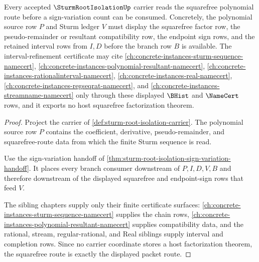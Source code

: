 \begin{theorem}
\label{thm:sturm-root-isolation-squarefree-route}
Every accepted $\SturmRootIsolationUp$ carrier reads the squarefree polynomial route before a sign-variation count can be consumed. Concretely, the polynomial source row $P$ and Sturm ledger $V$ must display the squarefree factor row, the pseudo-remainder or resultant compatibility row, the endpoint sign rows, and the retained interval rows from $I,D$ before the branch row $B$ is available. The interval-refinement certificate may cite \autoref{ch:concrete-instances-sturm-sequence-namecert}, \autoref{ch:concrete-instances-polynomial-resultant-namecert}, \autoref{ch:concrete-instances-rationalinterval-namecert}, \autoref{ch:concrete-instances-real-namecert}, \autoref{ch:concrete-instances-regseqrat-namecert}, and \autoref{ch:concrete-instances-streamname-namecert} only through these displayed $\BHist$ and $\NameCert$ rows, and it exports no host squarefree factorization theorem.
\end{theorem}
\begin{proof}
Project the carrier of \autoref{def:sturm-root-isolation-carrier}. The polynomial source row $P$ contains the coefficient, derivative, pseudo-remainder, and squarefree-route data from which the finite Sturm sequence is read.

Use the sign-variation handoff of \autoref{thm:sturm-root-isolation-sign-variation-handoff}. It places every branch consumer downstream of $P,I,D,V,B$ and therefore downstream of the displayed squarefree and endpoint-sign rows that feed $V$.

The sibling chapters supply only their finite certificate surfaces: \autoref{ch:concrete-instances-sturm-sequence-namecert} supplies the chain rows, \autoref{ch:concrete-instances-polynomial-resultant-namecert} supplies compatibility data, and the rational, stream, regular-rational, and Real siblings supply interval and completion rows. Since no carrier coordinate stores a host factorization theorem, the squarefree route is exactly the displayed packet route.
\end{proof}

